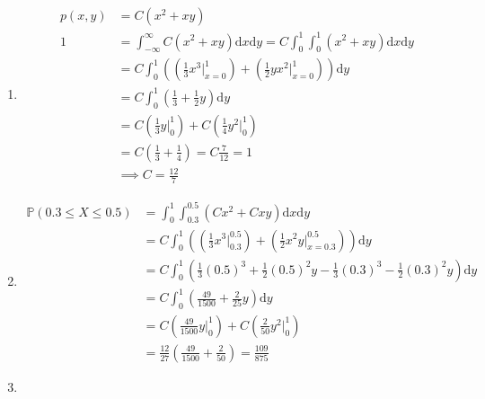 \begin{enumerate}[label=\alph*.]
\item
\begin{align*}
p(x, y) &= C(x^2 + xy) \\
1 &= \int_{-\infty}^{\infty} C (x^2 + xy) \mathrm d x \mathrm d y = C \int_0^1 \int_0^1 (x^2 + xy) \mathrm d x \mathrm d y \\
&= C \int_0^1 \left( \left( \frac{1}{3} x^3\Big|_{x=0}^1 \right) + \left( \frac{1}{2} y x^2 \Big|_{x=0}^1 \right) \right) \mathrm d y \\
&= C \int_0^1 \left(\frac{1}{3} +\frac{1}{2} y \right) \mathrm d y \\
&= C \left(\frac{1}{3}y \Big|_0^1\right) + C \left(\frac{1}{4} y^2 \Big|_0^1 \right) \\
&= C \left( \frac{1}{3} + \frac{1}{4} \right) = C \frac{7}{12} = 1\\
&\implies C = \frac{12}{7}
\end{align*}
\item
\begin{align*}
\mathbb{P}(0.3 \leq X \leq 0.5) &= \int_0^1 \int_{0.3}^{0.5} \left(Cx^2 + Cxy\right) \mathrm d x \mathrm d y \\
&= C \int_0^1 \left(\left(\frac{1}{3}x^3 \Big|_{0.3}^{0.5} \right) + \left( \frac{1}{2}x^2 y \Big|_{x=0.3}^{0.5} \right) \right) \mathrm d y \\
&= C \int_0^1 \left(\frac{1}{3}(0.5)^3 + \frac{1}{2}(0.5)^2 y - \frac{1}{3}(0.3)^3 - \frac{1}{2}(0.3)^2 y \right) \mathrm d y \\
&= C \int_0^1 \left(\frac{49}{1500} + \frac{2}{25} y \right) \mathrm d y \\
&= C \left( \frac{49}{1500}y \Big|_0^1 \right) + C \left( \frac{2}{50} y^2 \Big|_0^1 \right) \\
&= \frac{12}{27}\left(\frac{49}{1500} + \frac{2}{50} \right) = \frac{109}{875}
\end{align*}
\item


\end{enumerate}

